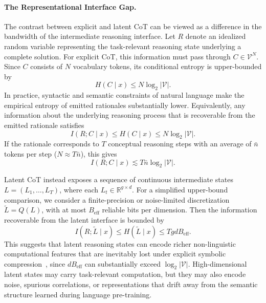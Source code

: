 \paragraph{The Representational Interface Gap.}
The contrast between explicit and latent CoT can be viewed as a difference in the bandwidth of the intermediate reasoning interface.
Let \(R\) denote an idealized random variable representing the task-relevant reasoning state underlying a complete solution.
For explicit CoT, this information must pass through \(C \in \mathcal{V}^N\).
Since \(C\) consists of \(N\) vocabulary tokens, its conditional entropy is upper-bounded by
\begin{equation}
    H(C \mid x) \le N \log_2 |\mathcal{V}|.
\end{equation}
In practice, syntactic and semantic constraints of natural language make the empirical entropy of emitted rationales substantially lower.
Equivalently, any information about the underlying reasoning process that is recoverable from the emitted rationale satisfies
\begin{equation}
    I(R; C \mid x) \le H(C \mid x) \le N \log_2 |\mathcal{V}|.
\end{equation}
If the rationale corresponds to \(T\) conceptual reasoning steps with an average of \(\bar{n}\) tokens per step (\(N \approx T \bar{n}\)), this gives
\begin{equation}
    I(R; C \mid x) \lesssim T \bar{n} \log_2 |\mathcal{V}|.
\end{equation}

Latent CoT instead exposes a sequence of continuous intermediate states \(L=(L_1,\ldots,L_T)\), where each \(L_t \in \mathbb{R}^{g \times d}\).
For a simplified upper-bound comparison, we consider a finite-precision or noise-limited discretization \(\tilde{L}=Q(L)\), with at most \(B_{\mathrm{eff}}\) reliable bits per dimension.
Then the information recoverable from the latent interface is bounded by
\begin{equation}
    I(R; \tilde{L} \mid x)
    \le H(\tilde{L} \mid x)
    \le T g d B_{\mathrm{eff}}.
    \label{eq:latent_entropy_bound}
\end{equation}
This suggests that latent reasoning states can encode richer non-linguistic computational features that are inevitably lost under explicit symbolic compression~\citep{zhu2025reasoning,zou2025latentcollaborationmultiagentsystems},  since \(d B_{\mathrm{eff}}\) can substantially exceed \(\log_2 |\mathcal{V}|\).
High-dimensional latent states may carry task-relevant computation, but they may also encode noise, spurious correlations, or representations that drift away from the semantic structure learned during language pre-training. 


